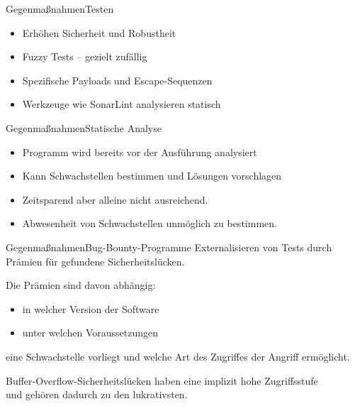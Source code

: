\begin{frame}{Gegenmaßnahmen}{Testen}
    \begin{itemize}
        \item Erhöhen Sicherheit und Robustheit
        \item Fuzzy Tests -- gezielt zufällig
        \item Spezifische Payloads und Escape-Sequenzen
        \item Werkzeuge wie SonarLint analysieren statisch%
    \end{itemize}    
\end{frame}


\begin{frame}{Gegenmaßnahmen}{Statische Analyse}

\begin{itemize}
    \item Programm wird bereits vor der Ausführung analysiert 
    \item Kann Schwachstellen bestimmen und Lösungen vorschlagen
    \item Zeitsparend aber alleine nicht ausreichend.
    \item Abwesenheit von Schwachstellen unmöglich zu bestimmen.    
\end{itemize}

\end{frame}


\begin{frame}{Gegenmaßnahmen}{Bug-Bounty-Programme} 
    Externalisieren von Tests durch Prämien für gefundene Sicherheitslücken.

    \vspace{1em}
    Die Prämien sind davon abhängig:
    \begin{itemize}
        \item in welcher Version der Software
        \item unter welchen Voraussetzungen
    \end{itemize}

    eine Schwachstelle vorliegt und welche Art des Zugriffes der Angriff ermöglicht.

    \vspace{1em}
    Buffer-Overflow-Sicherheitslücken haben eine implizit hohe Zugriffsstufe \\
    und gehören dadurch zu den lukrativsten.
    
    
\end{frame}


